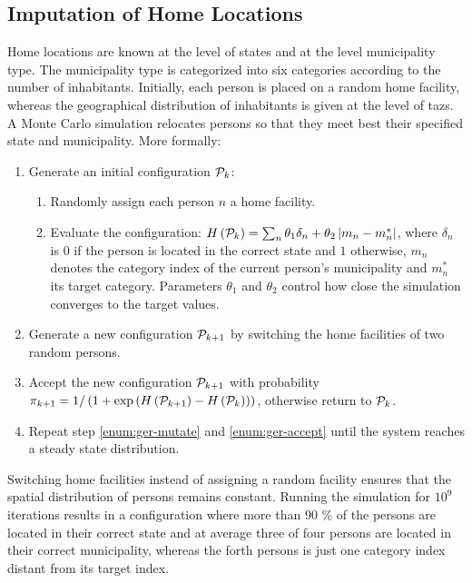 \subsection{Imputation of Home Locations}
\label{ch:germany:imputation1}
Home locations are known at the level of states and at the level municipality type. The municipality type is categorized into six categories according to the number of inhabitants. Initially, each person is placed on a random home facility, whereas the geographical distribution of inhabitants is given at the level of \glspl{taz}. A Monte Carlo simulation relocates persons so that they meet best their specified state and municipality. More formally:

\begin{enumerate}
\item Generate an initial configuration ${\cal P}_k$:
\begin{enumerate}
\item Randomly assign each person $n$ a home facility.

\item Evaluate the configuration: $H\left( {\cal P}_k \right)= \sum_n \theta_1 \delta_n+ \theta_2 \left| m_n - m_{n}^* \right|$, where $\delta_n$ is $0$ if the person is located in the correct state and $1$ otherwise, $m_n$ denotes the category index of the current person's municipality and $m_{n}^*$ its target category. Parameters $\theta_1$ and $\theta_2$ control how close the simulation converges to the target values.

\end{enumerate}

\item \label{enum:ger-mutate} Generate a new configuration ${\cal P}_{k+1}$ by switching the home facilities of two random persons.

\item \label{enum:ger-accept} Accept the new configuration ${\cal P}_{k+1}$ with probability $\pi_{k+1} = 1 / \left( 1 + \exp \left(  H\left( {\cal P}_{k+1} \right) - H \left( {\cal P}_{k} \right) \right)\right)$, otherwise return to ${\cal P}_{k}$.

\item Repeat step \ref{enum:ger-mutate} and \ref{enum:ger-accept} until the system reaches a steady state distribution.
\end{enumerate}

Switching home facilities instead of assigning a random facility ensures that the spatial distribution of persons remains constant. Running the simulation for $10^9$ iterations results in a configuration where more than 90 \% of the persons are located in their correct state and at average three of four persons are located in their correct municipality, whereas the forth persons is just one category index distant from its target index.

